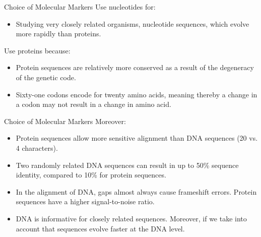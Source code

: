 \documentclass[10pt]{beamer}
\newcommand{\1}{
	\setbeamertemplate{background}{
		\texttt{[image: img/1]}
		\tikz[overlay] \fill[fill opacity=0.75,fill=white] (0,0) rectangle (-\paperwidth,\paperheight);
	}
}
\begin{document}
\begin{frame}{Choice of Molecular Markers}{}
	Use nucleotides for:
	\begin{block}{}
		\begin{itemize}
			\item Studying very closely related organisms, nucleotide sequences, which
			evolve more rapidly than proteins.
		\end{itemize}
	\end{block}

	Use proteins because:
	\begin{block}{}
		\begin{itemize}
			\item Protein sequences are relatively more conserved as a result of the degeneracy of the	genetic code.
			\item Sixty-one codons encode for twenty amino acids, meaning thereby a change in a codon may not result in a change in amino acid.
		\end{itemize}
	\end{block}
\end{frame}

\begin{frame}{Choice of Molecular Markers}{}
	Moreover:
	\begin{block}{}
		\begin{itemize}
			\item Protein sequences allow more sensitive alignment than	DNA sequences (20 vs. 4 characters). \pause
			\item Two randomly related DNA sequences can result in up to 50\%
			sequence identity, compared to 10\% for protein sequences. \pause
			\item In the alignment of DNA, gaps almost always cause	frameshift errors. Protein sequences have a higher signal-to-noise ratio. \pause
			\item DNA is informative for closely related sequences. Moreover, if we take into account that  sequences evolve faster at the DNA level.
		\end{itemize}
	\end{block}
\end{frame}
\end{document}
